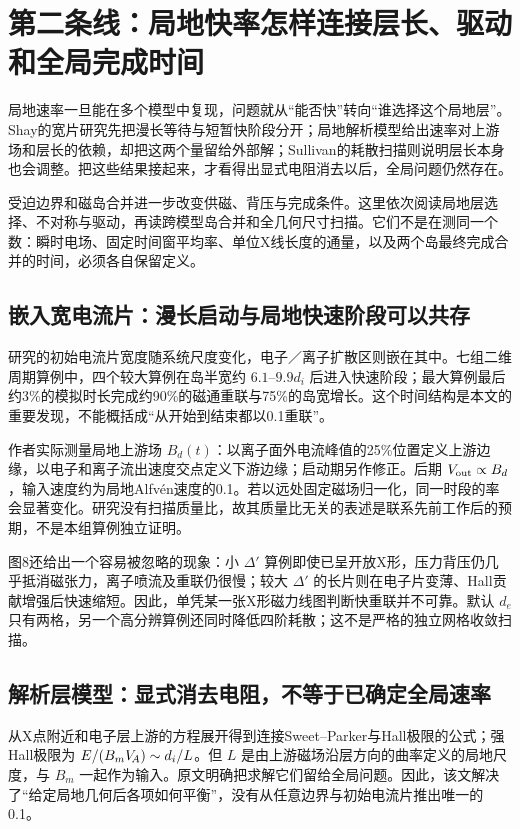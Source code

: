 \section{第二条线：局地快率怎样连接层长、驱动和全局完成时间}\label{story:global}
局地速率一旦能在多个模型中复现，问题就从“能否快”转向“谁选择这个局地层”。Shay的宽片研究先把漫长等待与短暂快阶段分开；局地解析模型给出速率对上游场和层长的依赖，却把这两个量留给外部解；Sullivan的耗散扫描则说明层长本身也会调整。把这些结果接起来，才看得出显式电阻消去以后，全局问题仍然存在。

受迫边界和磁岛合并进一步改变供磁、背压与完成条件。这里依次阅读局地层选择、不对称与驱动，再读跨模型岛合并和全几何尺寸扫描。它们不是在测同一个数：瞬时电场、固定时间窗平均率、单位X线长度的通量，以及两个岛最终完成合并的时间，必须各自保留定义。

\subsection{嵌入宽电流片：漫长启动与局地快速阶段可以共存}
\citet{Shay2004}研究的初始电流片宽度随系统尺度变化，电子／离子扩散区则嵌在其中。七组二维周期算例中，四个较大算例在岛半宽约 $6.1$--$9.9d_i$ 后进入快速阶段；最大算例最后约3\%的模拟时长完成约90\%的磁通重联与75\%的岛宽增长。这个时间结构是本文的重要发现，不能概括成“从开始到结束都以0.1重联”。

作者实际测量局地上游场 $B_d(t)$：以离子面外电流峰值的25\%位置定义上游边缘，以电子和离子流出速度交点定义下游边缘；启动期另作修正。后期 $V_{\rm out}\propto B_d$，输入速度约为局地Alfvén速度的0.1。若以远处固定磁场归一化，同一时段的率会显著变化。研究没有扫描质量比，故其质量比无关的表述是联系先前工作后的预期，不是本组算例独立证明。

图8还给出一个容易被忽略的现象：小 $\Delta'$ 算例即使已呈开放X形，压力背压仍几乎抵消磁张力，离子喷流及重联仍很慢；较大 $\Delta'$ 的长片则在电子片变薄、Hall贡献增强后快速缩短。因此，单凭某一张X形磁力线图判断快重联并不可靠。默认 $d_e$ 只有两格，另一个高分辨算例还同时降低四阶耗散；这不是严格的独立网格收敛扫描。

\subsection{解析层模型：显式消去电阻，不等于已确定全局速率}
\citet{Malyshkin2008}从X点附近和电子层上游的方程展开得到连接Sweet--Parker与Hall极限的公式；强Hall极限为 $E/(B_mV_{\!A})\sim d_i/L$。但 $L$ 是由上游磁场沿层方向的曲率定义的局地尺度，与 $B_m$ 一起作为输入。原文明确把求解它们留给全局问题。因此，该文解决了“给定局地几何后各项如何平衡”，没有从任意边界与初始电流片推出唯一的0.1。

